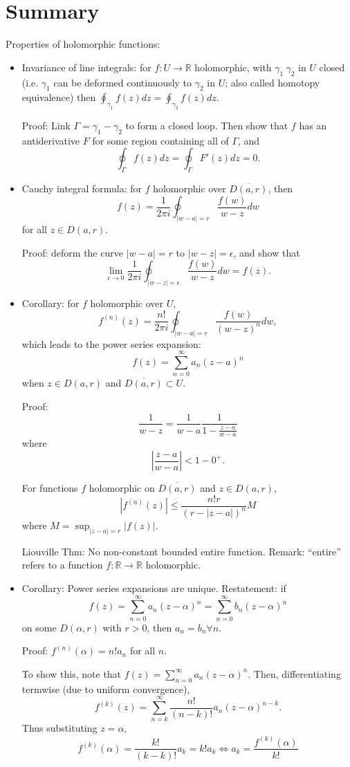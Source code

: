 \documentclass{artikel3}
\date{\formatdate{2012}{04}{20}}
\newcommand{\abs}[1]{\left|#1\right|}
\newcommand{\complex}{\mathbb{R}}
\numberwithin{equation}{enumi}
\begin{document}
\section{Summary}
Properties of holomorphic functions:
\begin{itemize}
	\item
		Invariance of line integrals: for $f:U\to\complex$ holomorphic,
		with $\gamma_1~\gamma_2$ in $U$ closed (i.e. $\gamma_1$ can be deformed
		continuously to $\gamma_2$ in $U$; also called homotopy equivalence) then
		$\oint_{\gamma_1}f(z)dz=\oint_{\gamma_2}f(z)dz$.
		
		Proof: Link $\Gamma=\gamma_1-\gamma_2$ to form a closed loop.
		Then show that $f$ has an antiderivative $F$  for some region containing
		all of $\Gamma$, and \[
			\oint_{\Gamma}f(z)dz=\oint_{\Gamma}F'(z)dz=0.
		\]
	\item
		Cauchy integral formula: for $f$ holomorphic over $\overline{D(a,r)}$,
		then \[
			f(z)=\frac{1}{2\pi i}\oint_{\abs{w-a}=r}\frac{f(w)}{w-z}dw
		\] for all $z\in D(a,r)$.
		
		Proof: deform the curve $\abs{w-a}=r$ to $\abs{w-z}=\epsilon$, and
		show that \[
			\lim_{\epsilon\to 0}\frac{1}{2\pi i}\oint_{\abs{w-z}=\epsilon}\frac{f(w)}{w-z}dw
			=f(z).
		\]
	\item
		Corollary: for $f$ holomorphic over $U$, \[
			f^{(n)}(z)=\frac{n!}{2\pi i}\oint_{\abs{w-a}=r}\frac{f(w)}{(w-z)^n}dw,
		\] which leads to the power series expansion: \[
			f(z)=\sum_{n=0}^{\infty} a_n(z-a)^n
		\] when $z\in D(a,r)$ and $\overline{D(a,r)}\subset U$.
		
		Proof: \[
			\frac{1}{w-z}=\frac{1}{w-a}\frac{1}{1-\frac{z-a}{w-a}}
		\] where \[
			\abs{\frac{z-a}{w-a}}<1-0^+.
		\]
		
		For functions $f$ holomorphic on $\overline{D(a,r)}$
		and $z\in D(a,r)$, \[
			\abs{f^{(n)}(z)}\leq \frac{n!r}{(r-\abs{z-a})^n}M
		\] where $M=\sup_{\abs{z-a}=r}\abs{f(z)}$.
		
		Liouville Thm: No non-constant bounded entire function.
		Remark: ``entire'' refers to a function $f:\complex\to\complex$ holomorphic.
	\item
		Corollary: Power series expansions are unique.
		Restatement: if \[
			f(z)=\sum_{n=0}^{\infty}a_n(z-\alpha)^n=\sum_{n=0}^{\infty}b_n(z-\alpha)^n
		\] on some $D(\alpha,r)$ with $r>0$, then $a_n=b_n\forall n$.
		
		Proof: $f^{(n)}(\alpha)=n!a_n$ for all $n$.
		
		To show this, note that $f(z)=\sum_{n=0}^{\infty}a_n(z-\alpha)^n$.
		Then, differentiating termwise (due to uniform convergence), \[
			f^{(k)}(z)=\sum_{n=k}^{\infty}\frac{n!}{(n-k)!}a_n(z-\alpha)^{n-k}.
		\] Thus substituting $z=\alpha$, \[
			f^{(k)}(\alpha)=\frac{k!}{(k-k)!}a_k=k!a_k \iff
			a_k=\frac{f^{(k)}(\alpha)}{k!}
		\]
\end{itemize}
\end{document}
